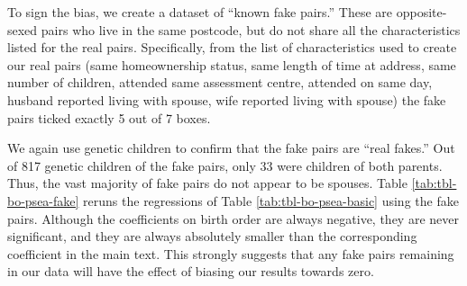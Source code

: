 \documentclass[
]{article}
\begin{document}
To sign the bias, we create a dataset of ``known fake pairs.'' These are
opposite-sexed pairs who live in the same postcode, but do not share all
the characteristics listed for the real pairs. Specifically, from the
list of characteristics used to create our real pairs (same
homeownership status, same length of time at address, same number of
children, attended same assessment centre, attended on same day, husband
reported living with spouse, wife reported living with spouse) the fake
pairs ticked exactly 5 out of 7 boxes.

We again use genetic children to confirm that the fake pairs are ``real
fakes.'' Out of 817 genetic children of the fake pairs, only
33 were children of both parents. Thus, the vast majority of
fake pairs do not appear to be spouses. Table
\ref{tab:tbl-bo-psea-fake} reruns the regressions of Table
\ref{tab:tbl-bo-psea-basic} using the fake pairs. Although the
coefficients on birth order are always negative, they are never
significant, and they are always absolutely smaller than the
corresponding coefficient in the main text. This strongly suggests that
any fake pairs remaining in our data will have the effect of biasing our
results towards zero.

 
  \providecommand{\huxb}[2]{\arrayrulecolor[RGB]{#1}\global\arrayrulewidth=#2pt}
  \providecommand{\huxvb}[2]{\color[RGB]{#1}\vrule width #2pt}
  \providecommand{\huxtpad}[1]{\rule{0pt}{#1}}
  \providecommand{\huxbpad}[1]{\rule[-#1]{0pt}{#1}}
\end{document}
